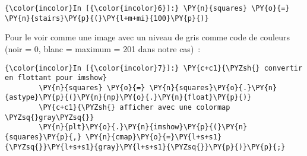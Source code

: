     \begin{Verbatim}[commandchars=\\\{\},frame=single,framerule=0.3mm,rulecolor=\color{cellframecolor}]
{\color{incolor}In [{\color{incolor}6}]:} \PY{n}{squares} \PY{o}{=} \PY{n}{stairs}\PY{p}{(}\PY{l+m+mi}{100}\PY{p}{)}
\end{Verbatim}


    Pour le voir comme une image avec un niveau de gris comme code de
couleurs (noir = 0, blanc = maximum = 201 dans notre cas)~:

    \begin{Verbatim}[commandchars=\\\{\},frame=single,framerule=0.3mm,rulecolor=\color{cellframecolor}]
{\color{incolor}In [{\color{incolor}7}]:} \PY{c+c1}{\PYZsh{} convertir en flottant pour imshow}
        \PY{n}{squares} \PY{o}{=} \PY{n}{squares}\PY{o}{.}\PY{n}{astype}\PY{p}{(}\PY{n}{np}\PY{o}{.}\PY{n}{float}\PY{p}{)}
        \PY{c+c1}{\PYZsh{} afficher avec une colormap \PYZsq{}gray\PYZsq{}}
        \PY{n}{plt}\PY{o}{.}\PY{n}{imshow}\PY{p}{(}\PY{n}{squares}\PY{p}{,} \PY{n}{cmap}\PY{o}{=}\PY{l+s+s1}{\PYZsq{}}\PY{l+s+s1}{gray}\PY{l+s+s1}{\PYZsq{}}\PY{p}{)}\PY{p}{;}
\end{Verbatim}


    \begin{center}
    \end{center}
    { \hspace*{\fill} \\}
    

    
    
    
